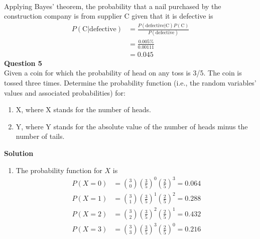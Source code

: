 \documentclass{uofa-eng-assignment}
\begin{document}
\begin{enumerate}
\begin{align*}
        \end{align*}
        Applying Bayes' theorem, the probability that a nail purchased by the construction company is from supplier C given that it is defective is
        \begin{align*}
            P(\text{C} | \text{defective}) & = \frac{P(\text{defective} | \text{C}) P(\text{C})}{P(\text{defective})} \\
                                           & = \frac{0.005\%}{0.00111}                                                \\
                                           & = \boldsymbol{0.045}
        \end{align*}
        \textbf{Question 5} \\
        Given a coin for which the probability of head on any toss is 3/5. The coin is tossed three times.
        Determine the probability function (i.e., the random variables’ values and associated
        probabilities) for:
        \begin{enumerate}
            \item X, where X stands for the number of heads.
            \item Y, where Y stands for the absolute value of the number of heads minus the
                  number of tails.
        \end{enumerate}
        \textbf{Solution}
        \begin{enumerate}
            \item The probability function for $X$ is
                  \begin{align*}
                      P(X = 0) & = \binom{3}{0} \left(\frac{3}{5}\right)^0 \left(\frac{2}{5}\right)^3 = \boldsymbol{0.064} \\
                      P(X = 1) & = \binom{3}{1} \left(\frac{3}{5}\right)^1 \left(\frac{2}{5}\right)^2 = \boldsymbol{0.288} \\
                      P(X = 2) & = \binom{3}{2} \left(\frac{3}{5}\right)^2 \left(\frac{2}{5}\right)^1 = \boldsymbol{0.432} \\
                      P(X = 3) & = \binom{3}{3} \left(\frac{3}{5}\right)^3 \left(\frac{2}{5}\right)^0 = \boldsymbol{0.216}

\end{align*}
\end{enumerate}
\end{enumerate}
\end{document}

